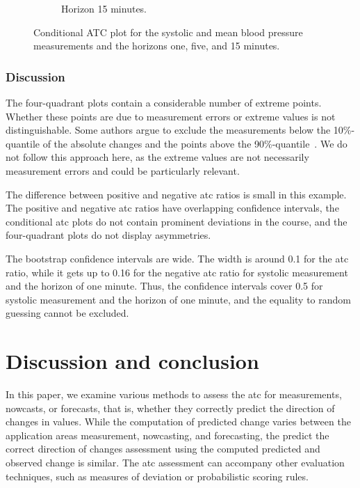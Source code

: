 \documentclass[pdflatex]{sn-jnl}
\theoremstyle{plain}%
\theoremstyle{definition}
\begin{document}
\begin{figure}
\begin{subfigure}[t]{.32\textwidth}
        \caption{Horizon 15 minutes.}
    \end{subfigure}\hspace{0.01\textwidth}
    \caption{Conditional ATC plot for the systolic and mean blood pressure measurements and the horizons one, five, and 15 minutes. }
    \label{fig:app-mimic-cond-prob}
\end{figure}




\subsubsection*{Discussion}

The four-quadrant plots contain a considerable number of extreme points.
Whether these points are due to measurement errors or extreme values is not distinguishable.
Some authors argue to exclude the measurements below the 10\%-quantile of the absolute changes and the points above the 90\%-quantile~\citep[see][]{Critchley2010}.
We do not follow this approach here, as the extreme values are not necessarily measurement errors and could be particularly relevant.

The difference between positive and negative \ac{atc} ratios is small in this example.
The positive and negative \ac{atc} ratios have overlapping confidence intervals, the conditional \ac{atc} plots do not contain prominent deviations in the course, and the four-quadrant plots do not display asymmetries.

The bootstrap confidence intervals are wide.
The width is around 0.1 for the \ac{atc} ratio, while it gets up to 0.16 for the negative \ac{atc} ratio for systolic measurement and the horizon of one minute.
Thus, the confidence intervals cover 0.5 for systolic measurement and the horizon of one minute, and the equality to random guessing cannot be excluded.



\section{Discussion and conclusion}\label{sec:atc-conclusion}

In this paper, we examine various methods to assess the \acf{atc} for measurements, nowcasts, or forecasts, that is, whether they correctly predict the direction of changes in values.
While the computation of predicted change varies between the application areas measurement, nowcasting, and forecasting, the predict the correct direction of changes assessment using the computed predicted and observed change is similar.
The \ac{atc} assessment can accompany other evaluation techniques, such as measures of deviation or probabilistic scoring rules.
\end{document}
